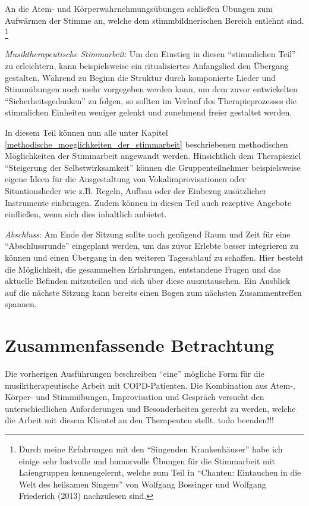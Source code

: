 An die Atem- und Körperwahrnehmungsübungen schließen Übungen zum Aufwärmen der Stimme an, welche dem stimmbildnerischen Bereich entlehnt sind. \footnote{Durch meine Erfahrungen mit den "`Singenden Krankenhäuser"' habe ich einige sehr lustvolle und humorvolle Übungen für die Stimmarbeit mit Laiengruppen kennengelernt, welche zum Teil in "`Chanten: Eintauchen in die Welt des heilsamen Singens"' von Wolfgang Bossinger und Wolfgang Friederich (2013) nachzulesen sind.}

\emph{Musiktherapeutische Stimmarbeit}: 
Um den Einstieg in diesen "`stimmlichen Teil"' zu erleichtern, kann beispielsweise ein ritualisiertes Anfangslied den Übergang gestalten. 
Während zu Beginn die Struktur durch komponierte Lieder und Stimmübungen noch mehr vorgegeben werden kann, um dem zuvor entwickelten "`Sicherheitsgedanken"' zu folgen, so sollten im Verlauf des Therapieprozesses die stimmlichen Einheiten weniger gelenkt und zunehmend freier gestaltet werden. 

In diesem Teil können nun alle unter Kapitel \ref{methodische_moeglichkeiten_der_stimmarbeit} beschriebenen methodischen Möglichkeiten der Stimmarbeit angewandt werden. 
Hinsichtlich dem Therapieziel "`Steigerung der Selbstwirksamkeit"' können die Gruppenteilnehmer beispielsweise eigene Ideen für die Ausgestaltung von Vokalimprovisationen oder Situationslieder wie z.B. Regeln, Aufbau oder der Einbezug zusätzlicher Instrumente einbringen. Zudem können in diesen Teil auch rezeptive Angebote einfließen, wenn sich dies inhaltlich anbietet.

\emph{Abschluss}:
Am Ende der Sitzung sollte noch genügend Raum und Zeit für eine "`Abschlussrunde"' eingeplant werden, um das zuvor Erlebte besser integrieren zu können und einen Übergang in den weiteren Tagesablauf zu schaffen. Hier besteht die Möglichkeit, die gesammelten Erfahrungen, entstandene Fragen und das aktuelle Befinden mitzuteilen und sich über diese auszutauschen. Ein Ausblick auf die nächste Sitzung kann bereits einen Bogen zum nächsten Zusammentreffen spannen.

\section{Zusammenfassende Betrachtung}
Die vorherigen Ausführungen beschreiben "`eine"' mögliche Form für die musiktherapeutische Arbeit mit COPD-Patienten. Die Kombination aus Atem-, Körper- und Stimmübungen, Improvisation und Gespräch versucht den unterschiedlichen Anforderungen und Besonderheiten gerecht zu werden, welche die Arbeit mit diesem Klientel an den Therapeuten stellt. todo beenden!!!




\ifpdf
    \graphicspath{{5_konzept/figures/PNG/}{5_konzept/figures/PDF/}{5_konzept/figures/}}
\else
    \graphicspath{{5_konzept/figures/EPS/}{5_konzept/figures/}}
\fi

\newpage\thispagestyle{empty}
